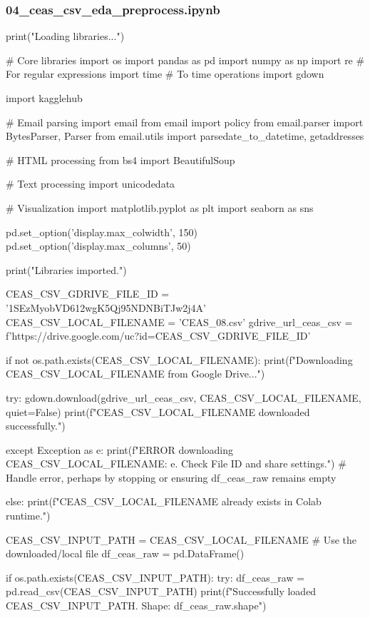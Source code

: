 \subsubsection*{04\_ceas\_csv\_eda\_preprocess.ipynb}

\begin{ffcode}
print("Loading libraries...")

# Core libraries
import os
import pandas as pd
import numpy as np
import re # For regular expressions
import time # To time operations
import gdown

import kagglehub

# Email parsing
import email
from email import policy
from email.parser import BytesParser, Parser
from email.utils import parsedate_to_datetime, getaddresses

# HTML processing
from bs4 import BeautifulSoup

# Text processing
import unicodedata

# Visualization
import matplotlib.pyplot as plt
import seaborn as sns

pd.set_option('display.max_colwidth', 150)
pd.set_option('display.max_columns', 50)

print("Libraries imported.\n")

CEAS_CSV_GDRIVE_FILE_ID = '1SEzMyobVD612wgK5Qj95NDNBiTJw2j4A'
CEAS_CSV_LOCAL_FILENAME = 'CEAS_08.csv'
gdrive_url_ceas_csv = f'https://drive.google.com/uc?id={CEAS_CSV_GDRIVE_FILE_ID}'

if not os.path.exists(CEAS_CSV_LOCAL_FILENAME):
    print(f"Downloading {CEAS_CSV_LOCAL_FILENAME} from Google Drive...")

    try:
        gdown.download(gdrive_url_ceas_csv, CEAS_CSV_LOCAL_FILENAME, quiet=False)
        print(f"{CEAS_CSV_LOCAL_FILENAME} downloaded successfully.")

    except Exception as e:
        print(f"ERROR downloading {CEAS_CSV_LOCAL_FILENAME}: {e}. Check File ID and share settings.")
        # Handle error, perhaps by stopping or ensuring df_ceas_raw remains empty

else:
    print(f"{CEAS_CSV_LOCAL_FILENAME} already exists in Colab runtime.")

CEAS_CSV_INPUT_PATH = CEAS_CSV_LOCAL_FILENAME # Use the downloaded/local file
df_ceas_raw = pd.DataFrame()

if os.path.exists(CEAS_CSV_INPUT_PATH):
    try:
        df_ceas_raw = pd.read_csv(CEAS_CSV_INPUT_PATH)
        print(f"Successfully loaded {CEAS_CSV_INPUT_PATH}. Shape: {df_ceas_raw.shape}")


\end{ffcode}
